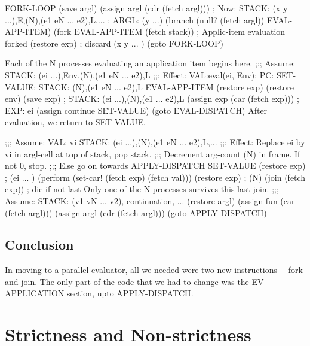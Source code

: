 \beginlisp
FORK-LOOP
  (save argl)
  (assign argl  (cdr (fetch argl)))
; Now: STACK: (x y ...),E,(N),(e1 eN ... e2),L,...
;      ARGL:    (y ...)
  (branch (null? (fetch argl)) EVAL-APP-ITEM)
  (fork EVAL-APP-ITEM (fetch stack))      ; Applic-item evaluation forked
\null
  (restore exp)                           ; discard (x y ... )
  (goto FORK-LOOP)
\endlisp

Each of the N processes evaluating an application item begins here.
\beginlisp
;;; Assume: STACK: (ei ...),Env,(N),(e1 eN ... e2),L
;;; Effect: VAL:eval(ei, Env); PC: SET-VALUE; STACK: (N),(e1 eN ... e2),L
\null
EVAL-APP-ITEM
  (restore exp)
  (restore env)
  (save exp)                       ; STACK: (ei ...),(N),(e1 ... e2),L
  (assign exp (car (fetch exp)))   ; EXP: ei
  (assign continue SET-VALUE)
  (goto EVAL-DISPATCH)
\endlisp
 After evaluation, we return to {\cf SET-VALUE}.

\beginlisp
;;; Assume: VAL: vi  STACK: (ei ...),(N),(e1 eN ... e2),L,...
;;; Effect: Replace ei by vi in argl-cell at top of stack, pop stack.
;;;         Decrement arg-count (N) in frame. If not 0, stop.
;;;         Else go on towards APPLY-DISPATCH
SET-VALUE
  (restore exp)                                  ; (ei ... )
  (perform (set-car! (fetch exp) (fetch val)))
  (restore exp)                                  ; (N)
  (join (fetch exp))                             ; die if not last
\endlisp
Only one of the N processes survives this last {\cf join}.
\beginlisp
;;; Assume: STACK: (v1 vN ... v2), continuation, ...
\null
  (restore argl)
  (assign fun (car (fetch argl)))
  (assign argl (cdr (fetch argl)))
  (goto APPLY-DISPATCH)
\endlisp

\subsection{Conclusion}

In moving to a parallel evaluator, all we needed were two new
instructions--- {\cf fork} and {\cf join}.  The only part of the code
that we had to change was the {\cf EV-APPLICATION} section, upto {\cf
APPLY-DISPATCH}.


\section{Strictness and Non-strictness}

\label{non-strictness}

